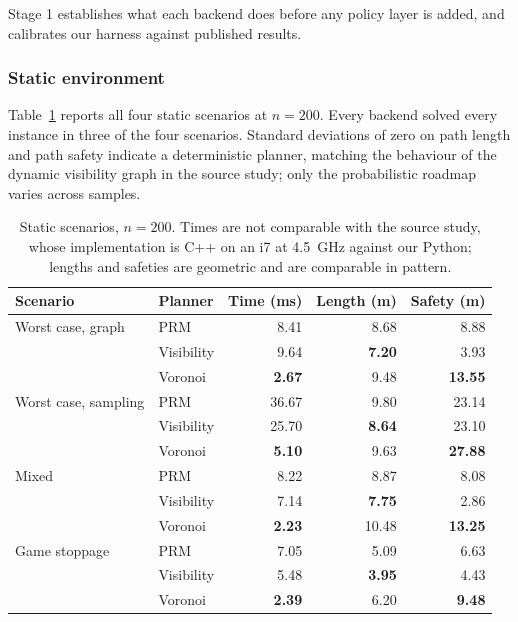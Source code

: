 Stage 1 establishes what each backend does before any policy layer is added,
and calibrates our harness against published results.

\subsubsection{Static environment}

Table~\ref{tab:static} reports all four static scenarios at $n=200$. Every
backend solved every instance in three of the four scenarios. Standard
deviations of zero on path length and path safety indicate a deterministic
planner, matching the behaviour of the dynamic visibility graph in the source
study; only the probabilistic roadmap varies across samples.

\begin{table}[t]
\centering
\small
\begin{tabular}{llrrr}
\hline
Scenario & Planner & Time (ms) & Length (m) & Safety (m) \\
\hline
Worst case, graph
 & PRM        & 8.41  & 8.68 & 8.88 \\
 & Visibility & 9.64  & \textbf{7.20} & 3.93 \\
 & Voronoi    & \textbf{2.67}  & 9.48 & \textbf{13.55} \\
\hline
Worst case, sampling
 & PRM        & 36.67 & 9.80 & 23.14 \\
 & Visibility & 25.70 & \textbf{8.64} & 23.10 \\
 & Voronoi    & \textbf{5.10}  & 9.63 & \textbf{27.88} \\
\hline
Mixed
 & PRM        & 8.22  & 8.87 & 8.08 \\
 & Visibility & 7.14  & \textbf{7.75} & 2.86 \\
 & Voronoi    & \textbf{2.23}  & 10.48 & \textbf{13.25} \\
\hline
Game stoppage
 & PRM        & 7.05  & 5.09 & 6.63 \\
 & Visibility & 5.48  & \textbf{3.95} & 4.43 \\
 & Voronoi    & \textbf{2.39}  & 6.20 & \textbf{9.48} \\
\hline
\end{tabular}
\caption{Static scenarios, $n=200$. Times are not comparable with the source
study, whose implementation is C++ on an i7 at 4.5~GHz against our Python;
lengths and safeties are geometric and are comparable in pattern.}
\label{tab:static}
\end{table}

